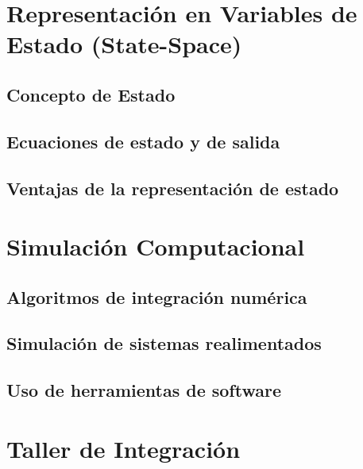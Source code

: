 \documentclass[11pt,a4paper,openany]{book}
\begin{document}
\chapter{Representación en Variables de Estado (State-Space)}

\section{Concepto de Estado}

\section{Ecuaciones de estado y de salida}

\section{Ventajas de la representación de estado}

\chapter{Simulación Computacional}

\section{Algoritmos de integración numérica}

\section{Simulación de sistemas realimentados}

\section{Uso de herramientas de software}



\chapter{Taller de Integración}
\end{document}
